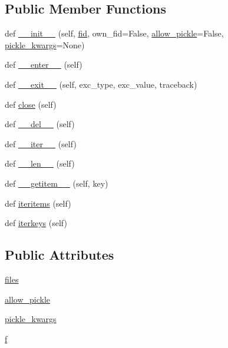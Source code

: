 \subsection*{Public Member Functions}
\begin{DoxyCompactItemize}
\item 
def \hyperlink{classnumpy_1_1lib_1_1npyio_1_1NpzFile_adf81787a0d2d9a46345a30dfd085d5b3}{\+\_\+\+\_\+init\+\_\+\+\_\+} (self, \hyperlink{classnumpy_1_1lib_1_1npyio_1_1NpzFile_a5111469fe872459c2713ed08a41730b8}{fid}, own\+\_\+fid=False, \hyperlink{classnumpy_1_1lib_1_1npyio_1_1NpzFile_a01370fae1d49fefe16759cdd911fe013}{allow\+\_\+pickle}=False, \hyperlink{classnumpy_1_1lib_1_1npyio_1_1NpzFile_a9e182b2b99017abc9b1b857dcb26f37f}{pickle\+\_\+kwargs}=None)
\item 
def \hyperlink{classnumpy_1_1lib_1_1npyio_1_1NpzFile_aa6491d4a0f468ad55691caf7577433f2}{\+\_\+\+\_\+enter\+\_\+\+\_\+} (self)
\item 
def \hyperlink{classnumpy_1_1lib_1_1npyio_1_1NpzFile_a0e33aed8f407d1c4d53e0260d4751979}{\+\_\+\+\_\+exit\+\_\+\+\_\+} (self, exc\+\_\+type, exc\+\_\+value, traceback)
\item 
def \hyperlink{classnumpy_1_1lib_1_1npyio_1_1NpzFile_a733921dd2b5e7e2e123ba35fbf1217a8}{close} (self)
\item 
def \hyperlink{classnumpy_1_1lib_1_1npyio_1_1NpzFile_ab7c79d421e510d91d992226c94bd55fe}{\+\_\+\+\_\+del\+\_\+\+\_\+} (self)
\item 
def \hyperlink{classnumpy_1_1lib_1_1npyio_1_1NpzFile_a00755f520d62fd92dfbca8cc9e77736d}{\+\_\+\+\_\+iter\+\_\+\+\_\+} (self)
\item 
def \hyperlink{classnumpy_1_1lib_1_1npyio_1_1NpzFile_aadf4d804453dbb6ca7a912e30a2e83cf}{\+\_\+\+\_\+len\+\_\+\+\_\+} (self)
\item 
def \hyperlink{classnumpy_1_1lib_1_1npyio_1_1NpzFile_a2fb5158205cc6970fcbc2ca50db9e109}{\+\_\+\+\_\+getitem\+\_\+\+\_\+} (self, key)
\item 
def \hyperlink{classnumpy_1_1lib_1_1npyio_1_1NpzFile_a8d28dd09aaf01970df69249aaddf0169}{iteritems} (self)
\item 
def \hyperlink{classnumpy_1_1lib_1_1npyio_1_1NpzFile_a211b98e832f585ad22d23c53f108570d}{iterkeys} (self)
\end{DoxyCompactItemize}
\subsection*{Public Attributes}
\begin{DoxyCompactItemize}
\item 
\hyperlink{classnumpy_1_1lib_1_1npyio_1_1NpzFile_a39caf915254dcc868cedeb69dd307406}{files}
\item 
\hyperlink{classnumpy_1_1lib_1_1npyio_1_1NpzFile_a01370fae1d49fefe16759cdd911fe013}{allow\+\_\+pickle}
\item 
\hyperlink{classnumpy_1_1lib_1_1npyio_1_1NpzFile_a9e182b2b99017abc9b1b857dcb26f37f}{pickle\+\_\+kwargs}
\item 
\hyperlink{classnumpy_1_1lib_1_1npyio_1_1NpzFile_a2a281820632477b63ead82d06cef1f3a}{f}
\end{DoxyCompactItemize}
